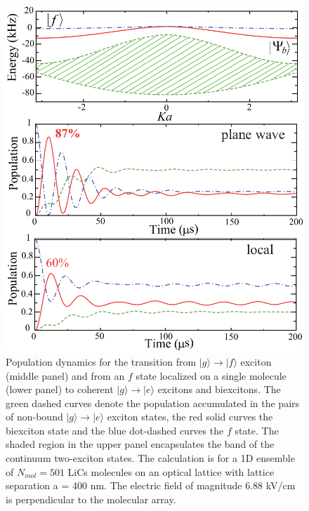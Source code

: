 \begin{figure}[htbp]
\centering
\includegraphics[scale=0.8]{Figure4.pdf}
\caption{Population dynamics for the transition from $|g\rangle \to |f\rangle$ exciton (middle panel) and from an $f$
 state localized on a single molecule (lower panel) to coherent $|g\rangle \to |e\rangle$ excitons and biexcitons. The
 green dashed curves denote the population accumulated in the pairs of non-bound $|g\rangle \to |e\rangle$ exciton
 states, the red solid curves the biexciton state and the blue dot-dashed curves the $f$ state. The shaded region in the
 upper panel encapsulates the band of the continuum two-exciton states. The calculation is for a 1D ensemble of
 $N_{mol}=501$ LiCs molecules on an optical lattice with lattice separation a = 400 nm. The electric field of magnitude
 6.88 kV/cm is perpendicular to the molecular array.}
\label{fig:populationDynamics}
\end{figure}



